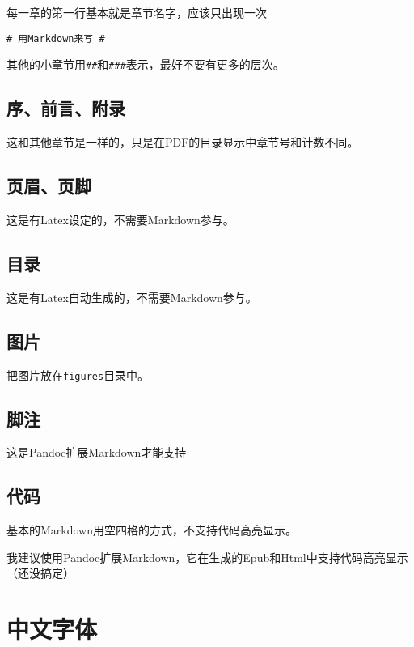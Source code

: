 \documentclass[a4paper]{book}
\begin{document}
每一章的第一行基本就是章节名字，应该只出现一次

{\footnotesize\begin{shaded}\begin{verbatim}
# 用Markdown来写 #
\end{verbatim}\end{shaded}}
其他的小章节用{\texttt{\#{}\#{}}}和{\texttt{\#{}\#{}\#{}}}表示，最好不要有更多的层次。

\subsection{序、前言、附录}

这和其他章节是一样的，只是在PDF的目录显示中章节号和计数不同。

\subsection{页眉、页脚}

这是有Latex设定的，不需要Markdown参与。

\subsection{目录}

这是有Latex自动生成的，不需要Markdown参与。

\subsection{图片}

把图片放在{\texttt{figures}}目录中。

\subsection{脚注}

这是Pandoc扩展Markdown才能支持

\subsection{代码}

基本的Markdown用空四格的方式，不支持代码高亮显示。

我建议使用Pandoc扩展Markdown，它在生成的Epub和Html中支持代码高亮显示（还没搞定）

\section{中文字体}
\end{document}
